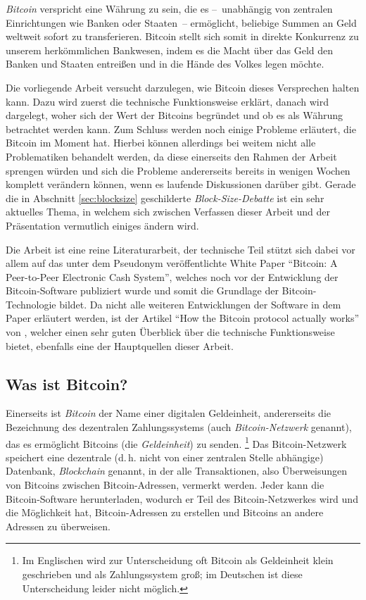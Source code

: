 \emph{Bitcoin} verspricht eine Währung zu sein, die es --~unabhängig von zentralen Einrichtungen wie Banken oder Staaten~-- ermöglicht, beliebige Summen an Geld weltweit sofort zu transferieren.
Bitcoin stellt sich somit in direkte Konkurrenz zu unserem herkömmlichen Bankwesen, indem es die Macht über das Geld den Banken und Staaten entreißen und in die Hände des Volkes legen möchte.

Die vorliegende Arbeit versucht darzulegen, wie Bitcoin dieses Versprechen halten kann.
Dazu wird zuerst die technische Funktionsweise erklärt, danach wird dargelegt, woher sich der Wert der Bitcoins begründet und ob es als Währung betrachtet werden kann.
Zum Schluss werden noch einige Probleme erläutert, die Bitcoin im Moment hat.
Hierbei können allerdings bei weitem nicht alle Problematiken behandelt werden, da diese einerseits den Rahmen der Arbeit sprengen würden und sich die Probleme andererseits bereits in wenigen Wochen komplett verändern können, wenn es laufende Diskussionen darüber gibt.
Gerade die in Abschnitt \ref{sec:blocksize} geschilderte \emph{Block-Size-Debatte} ist ein sehr aktuelles Thema, in welchem sich zwischen Verfassen dieser Arbeit und der Präsentation vermutlich einiges ändern wird.

Die Arbeit ist eine reine Literaturarbeit, der technische Teil stützt sich dabei vor allem auf das unter dem Pseudonym  veröffentlichte White Paper "`Bitcoin: A Peer-to-Peer Electronic Cash System"', welches noch vor der Entwicklung der Bitcoin-Software publiziert wurde und somit die Grundlage der Bitcoin-Technologie bildet. \parencite{nakamoto}
Da nicht alle weiteren Entwicklungen der Software in dem Paper erläutert werden, ist der Artikel "`How the Bitcoin protocol actually works"' von , welcher einen sehr guten Überblick über die technische Funktionsweise bietet, ebenfalls eine der Hauptquellen dieser Arbeit. \parencite{nielsen}

\subsection{Was ist Bitcoin?}
\label{sec:bitcoinintro}

Einerseits ist \emph{Bitcoin} der Name einer digitalen Geldeinheit, andererseits die Bezeichnung des dezentralen Zahlungssystems (auch \emph{Bitcoin-Netzwerk} genannt), das es ermöglicht Bitcoins (die \emph{Geldeinheit}) zu senden.%
\footnote{Im Englischen wird zur Unterscheidung oft Bitcoin als Geldeinheit klein geschrieben und als Zahlungssystem groß; im Deutschen ist diese Unterscheidung leider nicht möglich.}
Das Bitcoin-Netzwerk speichert eine dezentrale (d.\,h. nicht von einer zentralen Stelle abhängige) Datenbank, \emph{Blockchain} genannt, in der alle Transaktionen, also Überweisungen von Bitcoins zwischen Bitcoin-Adressen, vermerkt werden.
Jeder kann die Bitcoin-Software herunterladen, wodurch er Teil des Bitcoin-Netzwerkes wird und die Möglichkeit hat, Bitcoin-Adressen zu erstellen und Bitcoins an andere Adressen zu überweisen.
